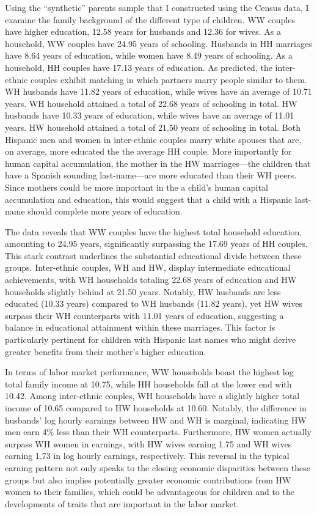 \documentclass[12pt,english]{article}
\begin{document}
Using the ``synthetic'' parents sample that I constructed using the Census data, I examine the family background of the different type of children. WW couples have higher education, 12.58 years for husbands and 12.36 for wives. As a household, WW couples have 24.95 years of schooling. Husbands in HH marriages have 8.64 years of education, while women have 8.49 years of schooling. As a household, HH couples have 17.13 years of education. As predicted, the inter-ethnic couples exhibit matching in which partners marry people similar to them. WH husbands have 11.82 years of education, while wives have an average of 10.71 years. WH household attained a total of 22.68 years of schooling in total. HW husbands have 10.33 years of education, while wives have an average of 11.01 years. HW household attained a total of 21.50 years of schooling in total. Both Hispanic men and women in inter-ethnic couples marry white spouses that are, on average, more educated the the average HH couple. More importantly for human capital accumulation, the mother in the HW marriages---the children that have a Spanish sounding last-name---are more educated than their WH peers. Since mothers could be more important in the a child's human capital accumulation and education, this would suggest that a child with a Hispanic last-name should complete more years of education. 

The data reveals that WW couples have the highest total household education, amounting to 24.95 years, significantly surpassing the 17.69 years of HH couples. This stark contrast underlines the substantial educational divide between these groups. Inter-ethnic couples, WH and HW, display intermediate educational achievements, with WH households totaling 22.68 years of education and HW households slightly behind at 21.50 years. Notably, HW husbands are less educated (10.33 years) compared to WH husbands (11.82 years), yet HW wives surpass their WH counterparts with 11.01 years of education, suggesting a balance in educational attainment within these marriages. This factor is particularly pertinent for children with Hispanic last names who might derive greater benefits from their mother's higher education.

In terms of labor market performance, WW households boast the highest log total family income at 10.75, while HH households fall at the lower end with 10.42. Among inter-ethnic couples, WH households have a slightly higher total income of 10.65 compared to HW households at 10.60. Notably, the difference in husbands' log hourly earnings between HW and WH is marginal, indicating HW men earn 4\% less than their WH counterparts. Furthermore, HW women actually surpass WH women in earnings, with HW wives earning 1.75 and WH wives earning 1.73 in log hourly earnings, respectively. This reversal in the typical earning pattern not only speaks to the closing economic disparities between these groups but also implies potentially greater economic contributions from HW women to their families, which could be advantageous for children and to the developments of traits that are important in the labor market.
\end{document}
